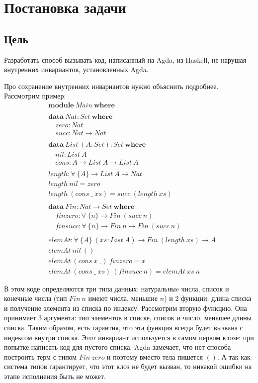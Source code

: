 \section{Постановка задачи}

\subsection{Цель}\label{sec:task-goal}

Разработать способ вызывать код, написанный на Agda, из Haskell, не нарушая
внутренних инвариантов, установленных Agda.

Про сохранение внутренних инвариантов нужно объяснить подробнее. Рассмотрим пример:
\begin{align*}
&\mathbf{module}\ Main\ \mathbf{where}\\
\\
&\mathbf{data}\ Nat : Set\ \mathbf{where}\\
&\quad zero : Nat\\
&\quad succ : Nat \rightarrow Nat\\
\\
&\mathbf{data}\ List\ (A : Set) : Set\ \mathbf{where}\\
&\quad nil : List\ A\\
&\quad cons : A \rightarrow List\ A \rightarrow List\ A\\
\\
&length : \forall\ \{A\} \rightarrow List\ A \rightarrow Nat\\
&length\ nil = zero\\
&length\ (cons\ \_\ xs) = succ\ (length\ xs)\\
\\
&\mathbf{data}\ Fin : Nat \rightarrow Set\ \mathbf{where}\\
&\quad finzero : \forall\ \{n\} \rightarrow Fin\ (succ\ n)\\
&\quad finsucc : \forall\ \{n\} \rightarrow Fin\ n \rightarrow Fin\ (succ\ n)\\
\\
&elemAt : \forall\ \{A\}\ (xs : List\ A) \rightarrow Fin\ (length\ xs) \rightarrow A\\
&elemAt\ nil\ ()\\
&elemAt\ (cons\ x\ \_)\ finzero = x\\
&elemAt\ (cons\ \_\ xs)\ (finsucc\ n) = elemAt\ xs\ n
\end{align*}

В этом коде определяются три типа данных: натуральныe числа,
список и конечные числа (тип \(Fin\ n\) имеют числа, меньшие \(n\)) и
2 функции: длина списка и получение элемента из списка по индексу.
Рассмотрим вторую функцию. Она принимает 3 аргумента: тип элементов
в списке, список и число, меньшее длины списка. Таким образом, есть
гарантия, что эта функция всегда будет вызвана с индексом внутри списка.
Этот инвариант используется в самом первом клозе:
при попытке написать код для пустого списка, Agda замечает, что нет способа
построить терм с типом \(Fin\ zero\) и поэтому вместо тела пишется \(()\).
А так как система типов гарантирует, что этот клоз не будет вызван, то
никакой ошибки на этапе исполнения быть не может.


